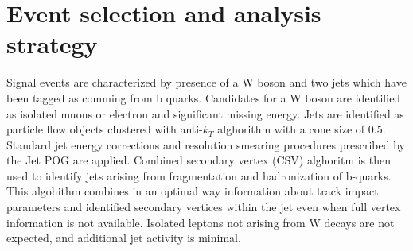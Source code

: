 
\chapter{Event selection and analysis strategy} %

\label{Chapter6} %


%
%
%
%
%
%
%
%
%
%

Signal events are characterized by presence of a W boson and two jets which have been tagged as comming from b quarks.
Candidates for a W boson are identified as isolated muons or electron and significant missing energy.
Jets are identified as particle flow objects clustered with anti-$k_T$ alghorithm with a cone size of $0.5$.
Standard jet energy corrections and resolution smearing procedures prescribed by the Jet POG are applied.
Combined secondary vertex (CSV) alghoritm is then used to identify jets arising from fragmentation and hadronization of b-quarks.
This algohithm combines in an optimal way information about track impact parameters and identified secondary vertices
within the jet even when full vertex information is not available.
Isolated leptons not arising from W decays are not expected, and additional jet activity is minimal.

